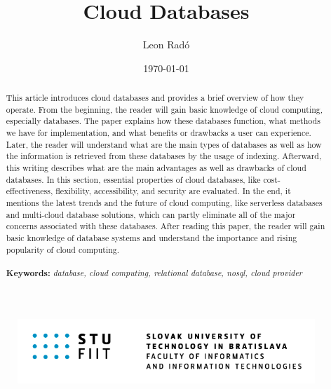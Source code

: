 \documentclass[12pt, a4paper]{article}
\title{\Huge Cloud Databases}
\author{\Large Leon Radó}
\date{\today}
\begin{document}
\maketitle
\begin{figure}[b]
    \centering
    \includegraphics[width=0.8\linewidth]{images/STU-FIIT.png}
\end{figure}
\thispagestyle{empty}

\clearpage
\tableofcontents

\clearpage
\begin{abstract}
    This article introduces cloud databases and provides a brief overview of how they operate. From the beginning, the reader will gain basic knowledge of cloud computing, especially databases. The paper explains how these databases function, what methods we have for implementation, and what benefits or drawbacks a user can experience. Later, the reader will understand what are the main types of databases as well as how the information is retrieved from these databases by the usage of indexing. Afterward, this writing describes what are the main advantages as well as drawbacks of cloud databases. In this section, essential properties of cloud databases, like cost-effectiveness, flexibility, accessibility, and security are evaluated. In the end, it mentions the latest trends and the future of cloud computing, like serverless databases and multi-cloud database solutions, which can partly eliminate all of the major concerns associated with these databases. After reading this paper, the reader will gain basic knowledge of database systems and understand the importance and rising popularity of cloud computing.\\\\
    \footnotesize{\textbf{Keywords: }\textit{database, cloud computing, relational database, nosql, cloud provider}}
\end{abstract}
\clearpage
\end{document}
